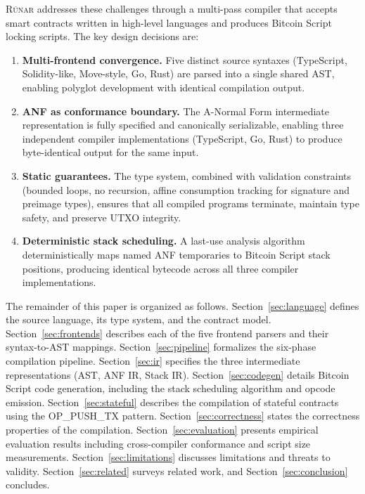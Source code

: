 \documentclass[11pt,a4paper]{article}
\newcommand{\runar}{\textsc{Rúnar}}
\begin{document}
\runar{} addresses these challenges through a multi-pass compiler that accepts
smart contracts written in high-level languages and produces Bitcoin Script
locking scripts. The key design decisions are:

\begin{enumerate}[label=(\roman*)]
  \item \textbf{Multi-frontend convergence.} Five distinct source syntaxes
    (TypeScript, Solidity-like, Move-style, Go, Rust) are parsed into a
    single shared AST, enabling polyglot development with identical
    compilation output.
  \item \textbf{ANF as conformance boundary.} The A-Normal Form intermediate
    representation is fully specified and canonically serializable, enabling
    three independent compiler implementations (TypeScript, Go, Rust) to
    produce byte-identical output for the same input.
  \item \textbf{Static guarantees.} The type system, combined with validation
    constraints (bounded loops, no recursion, affine consumption tracking
    for signature and preimage types), ensures that all compiled programs
    terminate, maintain type safety, and preserve UTXO integrity.
  \item \textbf{Deterministic stack scheduling.} A last-use analysis algorithm
    deterministically maps named ANF temporaries to Bitcoin Script stack
    positions, producing identical bytecode across all three compiler
    implementations.
\end{enumerate}

The remainder of this paper is organized as follows. Section~\ref{sec:language}
defines the source language, its type system, and the contract model.
Section~\ref{sec:frontends} describes each of the five frontend parsers and
their syntax-to-AST mappings. Section~\ref{sec:pipeline} formalizes the
six-phase compilation pipeline. Section~\ref{sec:ir} specifies the three
intermediate representations (AST, ANF IR, Stack IR).
Section~\ref{sec:codegen} details Bitcoin Script code generation, including
the stack scheduling algorithm and opcode emission.
Section~\ref{sec:stateful} describes the compilation of stateful contracts
using the OP\_PUSH\_TX pattern. Section~\ref{sec:correctness} states the
correctness properties of the compilation. Section~\ref{sec:evaluation}
presents empirical evaluation results including cross-compiler conformance
and script size measurements. Section~\ref{sec:limitations} discusses
limitations and threats to validity. Section~\ref{sec:related} surveys
related work, and Section~\ref{sec:conclusion} concludes.
\end{document}
